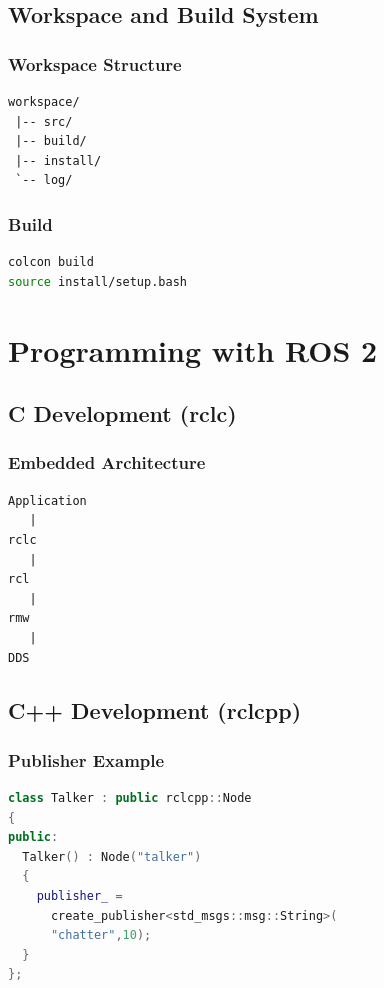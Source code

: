 \documentclass[11pt,oneside]{book}
\begin{document}
\chapter{Workspace and Build System}

\section{Workspace Structure}

\begin{verbatim}
workspace/
 |-- src/
 |-- build/
 |-- install/
 `-- log/
\end{verbatim}

\section{Build}

\begin{lstlisting}[language=bash]
colcon build
source install/setup.bash
\end{lstlisting}

\part{Programming with ROS 2}

\chapter{C Development (rclc)}

\section{Embedded Architecture}

\begin{verbatim}
Application
   |
rclc
   |
rcl
   |
rmw
   |
DDS
\end{verbatim}

\chapter{C++ Development (rclcpp)}

\section{Publisher Example}

\begin{lstlisting}[language=C++]
class Talker : public rclcpp::Node
{
public:
  Talker() : Node("talker")
  {
    publisher_ =
      create_publisher<std_msgs::msg::String>(
      "chatter",10);
  }
};
\end{lstlisting}
\end{document}

